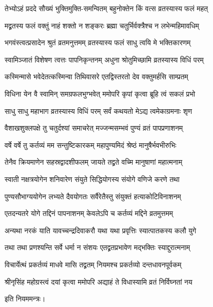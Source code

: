 \twolineshloka
{तेभ्योऽहं प्रददे सौख्यं भुक्तिमुक्ति-समन्वितम्}
{बहुनोक्तेन किं वत्स व्रतस्यास्य फलं महत्} %

\twolineshloka
{मद्व्रतस्य फलं वक्तुं नाहं शक्तो न शङ्करः}
{ब्रह्मा चतुर्भिर्वक्त्रैश्च न लभेन्महिमावधिम्} %

\twolineshloka
{भगवंस्त्वत्प्रसादेन श्रुतं व्रतमनुत्तमम्}
{व्रतस्यास्य फलं साधु त्वयि मे भक्तिकारणम्} %

\twolineshloka
{स्वामिञ्जातं विशेषण त्वत्तः पापनिकृन्तनम्}
{अधुना श्रोतुमिच्छामि व्रतस्यास्य विधिं परम्} %

\twolineshloka
{कस्मिन्मासे भवेदेतत्कस्मिन्वा तिथिवासरे}
{एतद्विस्तरतो देव वक्तुमर्हसि साम्प्रतम्} %

\twolineshloka
{विधिना येन वै स्वामिन् समग्रफलभुग्भवेत्}
{ममोपरि कृपां कृत्वा ब्रूहि त्वं सकलं प्रभो} %


\twolineshloka
{साधु साधु महाभाग व्रतस्यास्य विधिं परम्}
{सर्वं कथयतो मेऽद्य त्वमेकाग्रमनाः शृण} %

\twolineshloka
{वैशाखशुक्लपक्षे तु चतुर्दश्यां समाचरेत्}
{मज्जन्मसम्भवं पुण्यं व्रतं पापप्रणाशनम्} %


\twolineshloka
{वर्षे वर्षे तु कर्तव्यं मम सन्तुष्टिकारकम्}
{महापुण्यमिदं श्रेष्ठं मानुषैर्भवभीरुभिः} %

\twolineshloka
{तेनैव क्रियमाणेन सहस्रद्वादशीफलम्}
{जायते तद्व्रते वच्मि मानुषाणां महात्मनाम्} %

\twolineshloka
{स्वाती नक्षत्रयोगेन शनिवारेण संयुते}
{सिद्धियोगस्य संयोगे वणिजे करणे तथा} %

\twolineshloka
{पुण्यसौभाग्ययोगेन लभ्यते दैवयोगतः}
{सर्वैरेतैस्तु संयुक्तं हत्याकोटिविनाशनम्} %

\twolineshloka
{एतदन्यतरे योगे तद्दिनं पापनाशनम्}
{केवलेऽपि च कर्तव्यं मद्दिने व्रतमुत्तमम्} %

\twolineshloka
{अन्यथा नरकं याति यावच्चन्द्रदिवाकरौ}
{यथा यथा प्रवृत्तिः स्यात्पातकस्य कलौ युगे} %

\twolineshloka
{तथा तथा प्रणश्यन्ति सर्वे धर्मा न संशयः}
{एतद्व्रतप्रभावेण मद्भक्तिः स्याद्दुरात्मनाम्} %


\twolineshloka
{विचार्येत्थं प्रकर्तव्यं माधवे मासि तद्व्रतम्}
{नियमश्च प्रकर्तव्यो दन्तधावनपूर्वकम्} %


\twolineshloka
{श्रीनृसिंह महोग्रस्त्वं दयां कृत्वा ममोपरि}
{अद्याहं ते विधास्यामि व्रतं निर्विघ्नतां नय} %

इति नियममन्त्रः।

